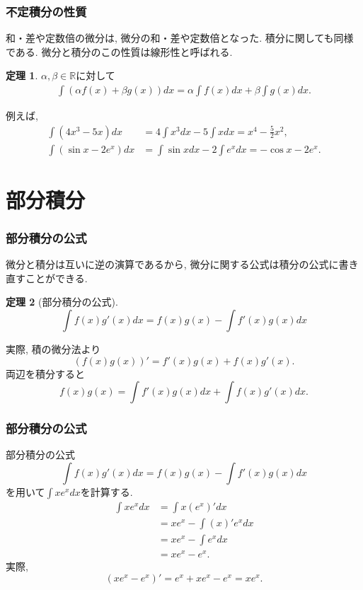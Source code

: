 \documentclass[dvipdfmx,cjk,10.2pt]{beamer}
\newcommand{\R}{\mathbb{R}}
\theoremstyle{definition}
\newtheorem{Thm}{定理}[section]
\begin{document}
\begin{frame}
\frametitle{不定積分の性質}

和・差や定数倍の微分は, 微分の和・差や定数倍となった. 
積分に関しても同様である.  
微分と積分のこの性質は線形性と呼ばれる. 

\begin{Thm}
$\alpha, \beta \in \R$に対して
\begin{align*}
\int (\alpha f(x) + \beta g(x))dx = \alpha \int f(x)dx + \beta \int g(x) dx.  
\end{align*}
\end{Thm}

例えば, 
\begin{align*}
\int (4x^3-5x)dx &= 4 \int x^3dx - 5 \int xdx = x^4-\frac{5}{2}x^2, \\
\int (\sin x - 2e^x) dx & = \int \sin x dx - 2 \int e^x dx = -\cos x -2e^x. 
\end{align*}

\end{frame}





\section{部分積分}

\begin{frame}
\frametitle{部分積分の公式}

微分と積分は互いに逆の演算であるから, 微分に関する公式は積分の公式に書き直すことができる. 

\begin{Thm}[部分積分の公式]
$$
\int f(x)g'(x)dx = f(x)g(x) - \int f'(x)g(x)dx
$$
\end{Thm}

実際, 積の微分法より
$$
(f(x)g(x))'=f'(x)g(x)+f(x)g'(x). 
$$
両辺を積分すると
$$
f(x)g(x)=\int f'(x)g(x)dx +\int f(x)g'(x)dx.
$$


\end{frame}





\begin{frame}
\frametitle{部分積分の公式}

部分積分の公式
$$
\int f(x)g'(x)dx = f(x)g(x) - \int f'(x)g(x)dx
$$
を用いて$\int x e^x dx$を計算する. 
\begin{align*}
\int x e^x dx &= \int x(e^x)'dx \\
& = xe^x-\int(x)'e^xdx \\
&= xe^x-\int e^xdx \\
& = xe^x - e^x. 
\end{align*}
実際, 
$$
(xe^x - e^x)'=e^x+xe^x-e^x=xe^x. 
$$

\end{frame}
\end{document}
